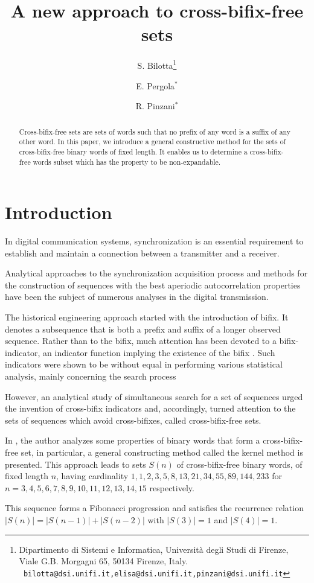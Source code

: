 \documentclass[a4paper,11pt]{article}
\date{}
\author{S. Bilotta\thanks{Dipartimento di Sistemi e Informatica, Universit\`a degli Studi di Firenze, Viale
 G.B. Morgagni 65, 50134 Firenze, Italy. {\newline
 \tt \ bilotta@dsi.unifi.it,\quad elisa@dsi.unifi.it,\quad pinzani@dsi.unifi.it}} \and E. Pergola$^*$\and R. Pinzani$^*$}
\title{A new approach to cross-bifix-free sets}
\begin{document}
\maketitle

\begin{abstract}
Cross-bifix-free sets are sets of words such that no prefix of any
word is a suffix of any other word. In this paper, we introduce a
general constructive method for the sets of cross-bifix-free
binary words of fixed length. It enables us to determine a
cross-bifix-free words subset which has the property to be
non-expandable.
\end{abstract}

\section{Introduction}

In digital communication systems, synchronization is an essential
requirement to establish and maintain a connection between a
transmitter and a receiver.


Analytical approaches to the synchronization acquisition process
and methods for the construction of sequences with the best
aperiodic autocorrelation properties have been the subject of
numerous analyses in the digital transmission.

The historical engineering approach started with the introduction
of bifix. It denotes a subsequence that is both a prefix and
suffix of a longer observed sequence. Rather than to the bifix,
much attention has been devoted to a bifix-indicator, an indicator
function implying the existence of the bifix \cite{10}. Such
indicators were shown to be without equal in performing various
statistical analysis, mainly concerning the search process
\cite{3,10}

However, an analytical study of simultaneous search for a set of
sequences urged the invention of cross-bifix indicators \cite{1,2}
and, accordingly, turned attention to the sets of sequences which
avoid cross-bifixes, called cross-bifix-free sets.

In \cite{1}, the author analyzes some properties of binary words
that form a cross-bifix-free set, in particular, a general
constructing method called the kernel method is presented. This
approach leads to sets $S(n)$ of cross-bifix-free binary words, of
fixed length $n$, having cardinality
$1,1,2,3,5,8,13,21,34,55,89,144,233$ for
$n=3,4,5,6,7,8,9,10,11,12,13,14,15$ respectively.

This sequence forms a Fibonacci progression and satisfies the
recurrence relation $|S(n)|=|S(n-1)|+|S(n-2)|$ with $|S(3)|=1$ and
$|S(4)|=1$.
\end{document}
